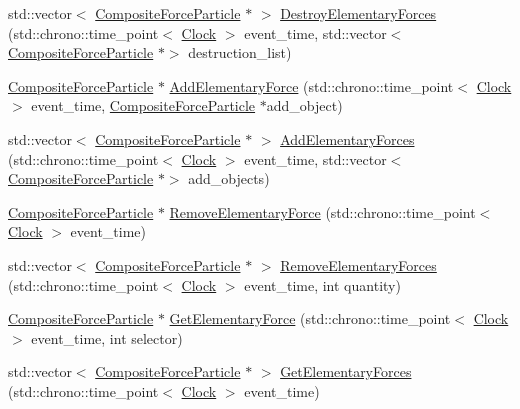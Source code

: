 \begin{DoxyCompactItemize}
\item 
std\+::vector$<$ \hyperlink{class_composite_force_particle}{Composite\+Force\+Particle} $\ast$ $>$ \hyperlink{class_composite_force_particle_af07d8607737f7881aac6314313d800e3}{Destroy\+Elementary\+Forces} (std\+::chrono\+::time\+\_\+point$<$ \hyperlink{universe_8h_a0ef8d951d1ca5ab3cfaf7ab4c7a6fd80}{Clock} $>$ event\+\_\+time, std\+::vector$<$ \hyperlink{class_composite_force_particle}{Composite\+Force\+Particle} $\ast$$>$ destruction\+\_\+list)
\item 
\hyperlink{class_composite_force_particle}{Composite\+Force\+Particle} $\ast$ \hyperlink{class_composite_force_particle_aed3a7ebcb98626c564dde2d54d45ff03}{Add\+Elementary\+Force} (std\+::chrono\+::time\+\_\+point$<$ \hyperlink{universe_8h_a0ef8d951d1ca5ab3cfaf7ab4c7a6fd80}{Clock} $>$ event\+\_\+time, \hyperlink{class_composite_force_particle}{Composite\+Force\+Particle} $\ast$add\+\_\+object)
\item 
std\+::vector$<$ \hyperlink{class_composite_force_particle}{Composite\+Force\+Particle} $\ast$ $>$ \hyperlink{class_composite_force_particle_ad0e97ed38272c7861d162afdf0db33c7}{Add\+Elementary\+Forces} (std\+::chrono\+::time\+\_\+point$<$ \hyperlink{universe_8h_a0ef8d951d1ca5ab3cfaf7ab4c7a6fd80}{Clock} $>$ event\+\_\+time, std\+::vector$<$ \hyperlink{class_composite_force_particle}{Composite\+Force\+Particle} $\ast$$>$ add\+\_\+objects)
\item 
\hyperlink{class_composite_force_particle}{Composite\+Force\+Particle} $\ast$ \hyperlink{class_composite_force_particle_afe5738b3ba1382dad085fa1ef39963b3}{Remove\+Elementary\+Force} (std\+::chrono\+::time\+\_\+point$<$ \hyperlink{universe_8h_a0ef8d951d1ca5ab3cfaf7ab4c7a6fd80}{Clock} $>$ event\+\_\+time)
\item 
std\+::vector$<$ \hyperlink{class_composite_force_particle}{Composite\+Force\+Particle} $\ast$ $>$ \hyperlink{class_composite_force_particle_a1bfa61cec4f5a8436c1a188312ba8f45}{Remove\+Elementary\+Forces} (std\+::chrono\+::time\+\_\+point$<$ \hyperlink{universe_8h_a0ef8d951d1ca5ab3cfaf7ab4c7a6fd80}{Clock} $>$ event\+\_\+time, int quantity)
\item 
\hyperlink{class_composite_force_particle}{Composite\+Force\+Particle} $\ast$ \hyperlink{class_composite_force_particle_a63b3daf44517c90bb805b6612dd26acc}{Get\+Elementary\+Force} (std\+::chrono\+::time\+\_\+point$<$ \hyperlink{universe_8h_a0ef8d951d1ca5ab3cfaf7ab4c7a6fd80}{Clock} $>$ event\+\_\+time, int selector)
\item 
std\+::vector$<$ \hyperlink{class_composite_force_particle}{Composite\+Force\+Particle} $\ast$ $>$ \hyperlink{class_composite_force_particle_a2e9da0590067cf243c0f2d239f712e7f}{Get\+Elementary\+Forces} (std\+::chrono\+::time\+\_\+point$<$ \hyperlink{universe_8h_a0ef8d951d1ca5ab3cfaf7ab4c7a6fd80}{Clock} $>$ event\+\_\+time)

\end{DoxyCompactItemize}
